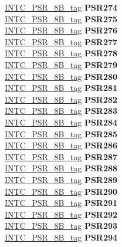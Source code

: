 \begin{DoxyCompactItemize}
\begin{tabbing}
\>\>\mbox{\hyperlink{unionINTC__PSR__8B__tag}{INTC\_PSR\_8B\_tag}} {\bfseries PSR274}\\
\>\>\mbox{\hyperlink{unionINTC__PSR__8B__tag}{INTC\_PSR\_8B\_tag}} {\bfseries PSR275}\\
\>\>\mbox{\hyperlink{unionINTC__PSR__8B__tag}{INTC\_PSR\_8B\_tag}} {\bfseries PSR276}\\
\>\>\mbox{\hyperlink{unionINTC__PSR__8B__tag}{INTC\_PSR\_8B\_tag}} {\bfseries PSR277}\\
\>\>\mbox{\hyperlink{unionINTC__PSR__8B__tag}{INTC\_PSR\_8B\_tag}} {\bfseries PSR278}\\
\>\>\mbox{\hyperlink{unionINTC__PSR__8B__tag}{INTC\_PSR\_8B\_tag}} {\bfseries PSR279}\\
\>\>\mbox{\hyperlink{unionINTC__PSR__8B__tag}{INTC\_PSR\_8B\_tag}} {\bfseries PSR280}\\
\>\>\mbox{\hyperlink{unionINTC__PSR__8B__tag}{INTC\_PSR\_8B\_tag}} {\bfseries PSR281}\\
\>\>\mbox{\hyperlink{unionINTC__PSR__8B__tag}{INTC\_PSR\_8B\_tag}} {\bfseries PSR282}\\
\>\>\mbox{\hyperlink{unionINTC__PSR__8B__tag}{INTC\_PSR\_8B\_tag}} {\bfseries PSR283}\\
\>\>\mbox{\hyperlink{unionINTC__PSR__8B__tag}{INTC\_PSR\_8B\_tag}} {\bfseries PSR284}\\
\>\>\mbox{\hyperlink{unionINTC__PSR__8B__tag}{INTC\_PSR\_8B\_tag}} {\bfseries PSR285}\\
\>\>\mbox{\hyperlink{unionINTC__PSR__8B__tag}{INTC\_PSR\_8B\_tag}} {\bfseries PSR286}\\
\>\>\mbox{\hyperlink{unionINTC__PSR__8B__tag}{INTC\_PSR\_8B\_tag}} {\bfseries PSR287}\\
\>\>\mbox{\hyperlink{unionINTC__PSR__8B__tag}{INTC\_PSR\_8B\_tag}} {\bfseries PSR288}\\
\>\>\mbox{\hyperlink{unionINTC__PSR__8B__tag}{INTC\_PSR\_8B\_tag}} {\bfseries PSR289}\\
\>\>\mbox{\hyperlink{unionINTC__PSR__8B__tag}{INTC\_PSR\_8B\_tag}} {\bfseries PSR290}\\
\>\>\mbox{\hyperlink{unionINTC__PSR__8B__tag}{INTC\_PSR\_8B\_tag}} {\bfseries PSR291}\\
\>\>\mbox{\hyperlink{unionINTC__PSR__8B__tag}{INTC\_PSR\_8B\_tag}} {\bfseries PSR292}\\
\>\>\mbox{\hyperlink{unionINTC__PSR__8B__tag}{INTC\_PSR\_8B\_tag}} {\bfseries PSR293}\\
\>\>\mbox{\hyperlink{unionINTC__PSR__8B__tag}{INTC\_PSR\_8B\_tag}} {\bfseries PSR294}\\

\end{tabbing}
\end{DoxyCompactItemize}

